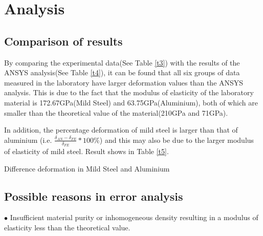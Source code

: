 \section{Analysis}
\label{sec:Section D}
\FloatBarrier %


\subsection*{Comparison of results}

By comparing the experimental data(See Table \ref{t3}) with the results of the ANSYS analysis(See Table \ref{t4}), 
it can be found that all six groups of data measured in the laboratory have 
larger deformation values than the ANSYS analysis. This is due to the fact 
that the modulus of elasticity of the laboratory material is 172.67GPa(Mild Steel) and 63.75GPa(Aluminium), 
both of which are smaller than the theoretical value of the material(210GPa and 71GPa).


In addition, the percentage deformation of mild steel is larger than 
that of aluminium 
(i.e. $\frac{\delta_{AN}-\delta_{FE}}{\delta_{FE}}*100\%$)
and this may also be due to the larger modulus of elasticity of mild steel.
Result shows in Table \ref{t5}.

\begin{minipage}[htbp]{\textwidth}
    \makeatletter{}
    \centering

    \caption{Difference deformation in Mild Steel and Aluminium}
    \label{t5} 
\end{minipage}






\subsection*{Possible reasons in error analysis}
$\bullet$ Insufficient material purity or inhomogeneous density 
resulting in a modulus of elasticity less than the theoretical value.


